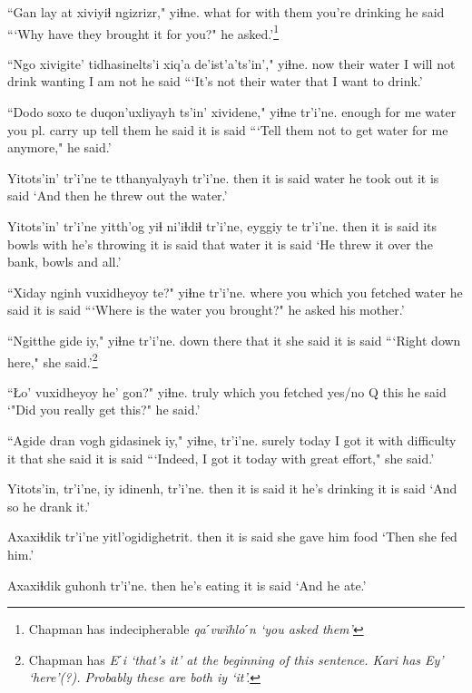 \documentclass[12pt]{article}
\begin{document}
\gll ``Gan lay at xiviyiɬ ngizrizr,"  yiɬne.
what for {} {with them} {you're drinking} {he said}
\glt ```Why have they brought it for you?" he asked.'\footnote{Chapman has indecipherable \em qaˊvw\u{i}hloˊn `you asked them'}
\glend

\gll ``Ngo xivigite' {tidhasinelts'i} xiq'a  de'ist'a'ts'in'," yiɬne.
now {their water} {I will not drink} wanting {I am not}  {he said}
\glt ```It's not their water that I want to drink.'
\glend

\gll ``Dodo soxo te duqon'uxliyayh ts'in' xividene," yiɬne tr'i'ne.
enough {for me} water {you pl. carry up} {} {tell them} {he said} {it is said}
\glt ```Tell them not to get water for me anymore," he said.'
\glend

\gll Yitots'in' tr'i'ne te tthanyalyayh tr'i'ne.
then  {it is said} water {he took out} {it is said}
\glt `And then he threw out the water.'
\glend

\gll Yitots'in' tr'i'ne yitth'og yiɬ ni'iɬdiɬ tr'i'ne, eyggiy te tr'i'ne.
then  {it is said} {its bowls} with {he's throwing} {it is said} that water {it is said}
\glt `He threw it over the bank, bowls and all.'
\glend

\gll ``Xiday nginh vuxidheyoy te?"  yiɬne tr'i'ne.
where you {which you fetched} water  {he said} {it is said}
\glt ```Where is the water you brought?" he asked his mother.'
\glend

\gll ``Ngitthe gide iy," yiɬne  tr'i'ne.
{down there} that it {she said} {it is said}
\glt ```Right down here," she said.'\footnote{Chapman has \em Eˊi \em `that's it' at the beginning of this sentence. Kari has \em Ey' \em `here'(?). Probably these are both \em iy \em `it'.}
\glend

\gll ``Ło' vuxidheyoy he'  gon?" yiɬne.
truly {which you fetched} {yes/no Q}  this  {he said}
\glt `"Did you really get this?" he said.'
\glend

\gll ``Agide dran {vogh gidasinek} iy," yiɬne, tr'i'ne.
surely today {I got it with difficulty} it that {she said} {it is said}
\glt ```Indeed, I got it today with great effort," she said.'
\glend

\gll Yitots'in, tr'i'ne, iy idinenh, tr'i'ne.
then  {it is said} it {he's drinking} {it is said}
\glt `And so he drank it.'
\glend

\gll Axaxiɬdik tr'i'ne yitl'ogidighetrit.
then  {it is said} {she gave him food}
\glt `Then she fed him.'
\glend

\gll Axaxiɬdik guhonh tr'i'ne.
then  {he's eating} {it is said}
\glt `And he ate.'
\glend
\end{document}
